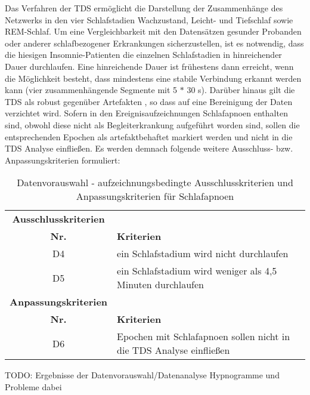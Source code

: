 Das Verfahren der \acs{TDS} ermöglicht die Darstellung der Zusammenhänge des Netzwerks in den vier Schlafstadien Wachzustand, Leicht- und Tiefschlaf sowie \acs{REM}-Schlaf. Um eine Vergleichbarkeit mit den Datensätzen gesunder Probanden oder anderer schlafbezogener Erkrankungen sicherzustellen, ist es notwendig, dass die hiesigen Insomnie-Patienten die einzelnen Schlafstadien in hinreichender Dauer durchlaufen. Eine hinreichende Dauer ist frühestens dann erreicht, wenn die Möglichkeit besteht, dass mindestens eine stabile Verbindung erkannt werden kann (vier zusammenhängende Segmente mit 5 $*$ 30 s). Darüber hinaus gilt die \acs{TDS} als robust gegenüber Artefakten \parencite{breuer_netzwerktopologie_2016}, so dass auf eine Bereinigung der Daten verzichtet wird. Sofern in den Ereignisaufzeichnungen Schlafapnoen enthalten sind, obwohl diese nicht als Begleiterkrankung aufgeführt worden sind, sollen die entsprechenden Epochen als artefaktbehaftet markiert werden und nicht in die \acs{TDS} Analyse einfließen. Es werden demnach folgende weitere Ausschluss- bzw. Anpassungskriterien formuliert:\\


\begin{table}[H] 
\begin{tabularx}{\textwidth}{cllX}
\toprule
\multicolumn{3}{c}{\textbf{Ausschlusskriterien}} & \\  
\cmidrule{1-3}
\multicolumn{3}{c}{\textbf{~~~~~~Nr.~~~~~~}} & \textbf{Kriterien}\\  
\midrule 
\multicolumn{3}{c}{D4} & ein Schlafstadium wird nicht durchlaufen\\
\multicolumn{3}{c}{D5} & ein Schlafstadium wird weniger als 4,5 Minuten durchlaufen\\
\midrule
\multicolumn{3}{c}{\textbf{Anpassungskriterien}} & \\  
\cmidrule{1-3}
\multicolumn{3}{c}{\textbf{~~~~~~Nr.~~~~~~}} & \textbf{Kriterien}\\  
\midrule 
\multicolumn{3}{c}{D6} & Epochen mit Schlafapnoen sollen nicht in die \acs{TDS} Analyse einfließen\\
\bottomrule
\end{tabularx}
\caption[Datenvorauswahl - aufzeichnungsbedingte Ausschlusskriterien]{Datenvorauswahl - aufzeichnungsbedingte Ausschlusskriterien und Anpassungskriterien für Schlafapnoen}
\label{tab:Datenanalyse-aufz}
\end{table}

TODO:
Ergebnisse der Datenvorauswahl/Datenanalyse
Hypnogramme und Probleme dabei

